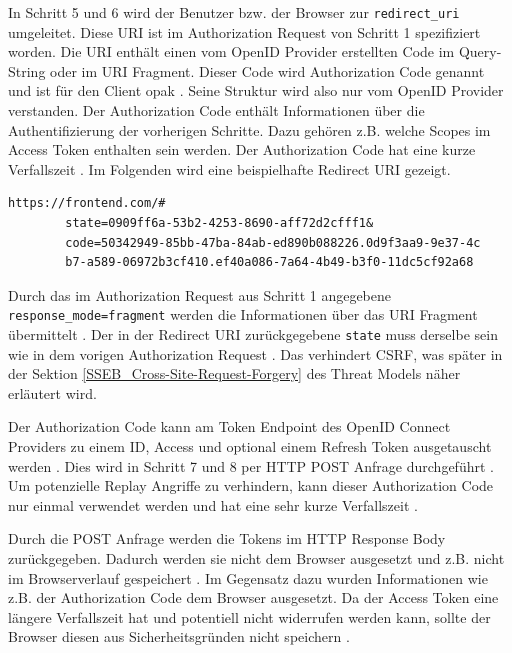 In Schritt 5 und 6 wird der Benutzer bzw. der Browser zur \texttt{redirect\_uri} umgeleitet. Diese URI ist im Authorization Request von Schritt 1 spezifiziert worden. Die URI enthält einen vom OpenID Provider erstellten Code im Query-String oder im URI Fragment. Dieser Code wird Authorization Code genannt und ist für den Client opak \cite{EB67}. Seine Struktur wird also nur vom OpenID Provider verstanden. Der Authorization Code enthält Informationen über die Authentifizierung der vorherigen Schritte. Dazu gehören z.B. welche Scopes im Access Token enthalten sein werden. Der Authorization Code hat eine kurze Verfallszeit \cite[Authorization Code Flow]{SSEB_keycloakDocs}. Im Folgenden wird eine beispielhafte Redirect URI gezeigt.

\begin{lstlisting}[caption=Beispiel Redirect URI, captionpos=b, label=EBBeispielRedirectURI]
https://frontend.com/#
        state=0909ff6a-53b2-4253-8690-aff72d2cfff1&
        code=50342949-85bb-47ba-84ab-ed890b088226.0d9f3aa9-9e37-4c
        b7-a589-06972b3cf410.ef40a086-7a64-4b49-b3f0-11dc5cf92a68
\end{lstlisting}

Durch das im Authorization Request aus Schritt 1 angegebene \texttt{response\_mode=fragment} werden die Informationen über das URI Fragment übermittelt \cite[JavaScript Adapter Reference]{EB26}. Der in der Redirect URI zurückgegebene \texttt{state} muss derselbe sein wie in dem vorigen Authorization Request \cite[End-User Grants Authorization]{EB20}. Das verhindert CSRF, was später in der Sektion \ref{SSEB_Cross-Site-Request-Forgery} des Threat Models näher erläutert wird.

Der Authorization Code kann am Token Endpoint des OpenID Connect Providers zu einem ID, Access und optional einem Refresh Token ausgetauscht werden \cite[Token Endpoint]{EB4}. Dies wird in Schritt 7 und 8 per HTTP POST Anfrage durchgeführt \cite{EB20}. Um potenzielle Replay Angriffe zu verhindern, kann dieser Authorization Code nur einmal verwendet werden und hat eine sehr kurze Verfallszeit \cite[Authorization Code Flow]{SSEB_keycloakDocs}.

Durch die POST Anfrage werden die Tokens im HTTP Response Body zurückgegeben. Dadurch werden sie nicht dem Browser ausgesetzt \cite{EB22} und z.B. nicht im Browserverlauf gespeichert \cite[Implicit Flow]{SSEB_keycloakDocs}. Im Gegensatz dazu wurden Informationen wie z.B. der Authorization Code dem Browser ausgesetzt. Da der Access Token eine längere Verfallszeit hat und potentiell nicht widerrufen werden kann, sollte der Browser diesen aus Sicherheitsgründen nicht speichern \cite[Implicit Flow]{SSEB_keycloakDocs}.

